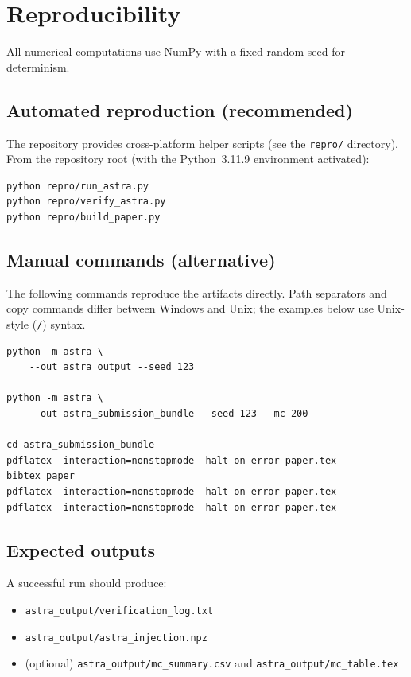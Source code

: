 \section{Reproducibility}
\label{sec:repro}

All numerical computations use NumPy \cite{harris2020} with a fixed random seed for determinism.

\subsection{Automated reproduction (recommended)}
The repository provides cross-platform helper scripts (see the \texttt{repro/} directory).  From the repository root (with the Python~3.11.9 environment activated):
\begin{verbatim}
python repro/run_astra.py
python repro/verify_astra.py
python repro/build_paper.py
\end{verbatim}

\subsection{Manual commands (alternative)}
The following commands reproduce the artifacts directly.  Path separators and copy commands differ between Windows and Unix; the examples below use Unix-style (\texttt{/}) syntax.
\begin{verbatim}
python -m astra \
    --out astra_output --seed 123

python -m astra \
    --out astra_submission_bundle --seed 123 --mc 200

cd astra_submission_bundle
pdflatex -interaction=nonstopmode -halt-on-error paper.tex
bibtex paper
pdflatex -interaction=nonstopmode -halt-on-error paper.tex
pdflatex -interaction=nonstopmode -halt-on-error paper.tex
\end{verbatim}

\subsection{Expected outputs}
A successful run should produce:
\begin{itemize}
\item \texttt{astra\_output/verification\_log.txt}
\item \texttt{astra\_output/astra\_injection.npz}
\item (optional) \texttt{astra\_output/mc\_summary.csv} and \texttt{astra\_output/mc\_table.tex}
\end{itemize}

